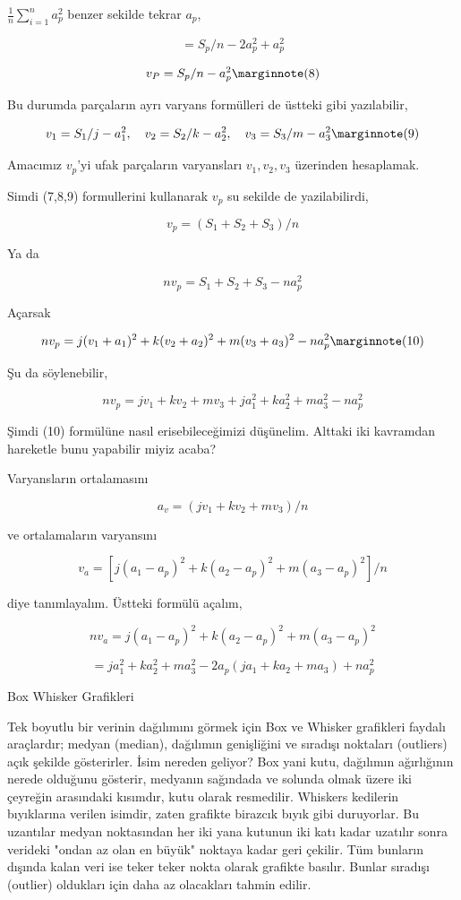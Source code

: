\documentclass[12pt,fleqn]{article}\usepackage{../../common}
\begin{document}
$\frac{1}{n} \sum_{i=1}^{n} a_p^2$ benzer sekilde tekrar $a_p$, 

$$
= S_p / n  - 2 a_p^2 +  a_p^2
$$

$$
v_P = S_p / n  -  a_p^2
\mlabel{8}
$$

Bu durumda parçaların ayrı varyans formülleri de üstteki gibi yazılabilir,

$$
v_1 = S_1 / j  -  a_1^2, \quad
v_2 = S_2 / k  -  a_2^2, \quad
v_3 = S_3 / m  -  a_3^2
\mlabel{9}
$$

Amacımız $v_p$'yi ufak parçaların varyansları $v_1,v_2,v_3$ üzerinden hesaplamak.

Simdi (7,8,9) formullerini kullanarak $v_p$ su sekilde de yazilabilirdi,

$$
v_p = (S_1 + S_2 + S_3) / n
$$

Ya da

$$
n v_p = S_1 + S_2 + S_3 - n a_p^2
$$

Açarsak

$$
n v_p = j (v_1 + a_1)^2 + k (v_2 + a_2)^2 + m (v_3 + a_3)^2 - n a_p^2
\mlabel{10}
$$

Şu da söylenebilir,

$$
n v_p = j v_1 + k v_2 + m v_3 + j a_1^2 + k a_2^2 + m a_3^2 - n a_p^2
$$

Şimdi (10) formülüne nasıl erisebileceğimizi düşünelim. Alttaki iki kavramdan
hareketle bunu yapabilir miyiz acaba?

Varyansların ortalamasını

$$
a_v = (j v_1 + k v_2 + m v_3) / n
$$

ve ortalamaların varyansını

$$
v_a = [ j(a_1-a_p)^2 + k(a_2-a_p)^2 + m(a_3-a_p)^2 ] / n
$$

diye tanımlayalım. Üstteki formülü açalım,

$$
n v_a = j(a_1-a_p)^2 + k(a_2-a_p)^2 + m(a_3-a_p)^2 
$$

$$
= j a_1^2 + k a_2^2 + m a_3^2 - 2 a_p (ja_1 + ka_2 + ma_3) + n a_p^2
$$


Box Whisker Grafikleri

Tek boyutlu bir verinin dağılımını görmek için Box ve Whisker grafikleri
faydalı araçlardır; medyan (median), dağılımın genişliğini ve sıradışı
noktaları (outliers) açık şekilde gösterirler. İsim nereden geliyor? Box
yani kutu, dağılımın ağırlığının nerede olduğunu gösterir, medyanın
sağındada ve solunda olmak üzere iki çeyreğin arasındaki kısımdır, kutu
olarak resmedilir. Whiskers kedilerin bıyıklarına verilen isimdir, zaten
grafikte birazcık bıyık gibi duruyorlar. Bu uzantılar medyan noktasından
her iki yana kutunun iki katı kadar uzatılır sonra verideki "ondan az olan
en büyük" noktaya kadar geri çekilir. Tüm bunların dışında kalan veri ise
teker teker nokta olarak grafikte basılır. Bunlar sıradışı (outlier)
oldukları için daha az olacakları tahmin edilir.
\end{document}
